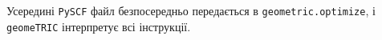 Усередині \texttt{PySCF} файл безпосередньо передається в
\texttt{geometric.optimize}, і \texttt{geomeTRIC} інтерпретує всі інструкції.

%
%
%
%
%
%
%
%
%
%

